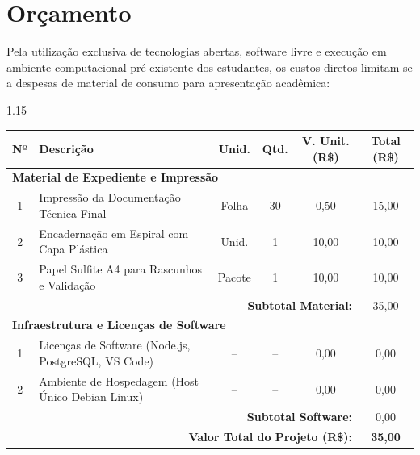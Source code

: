 \documentclass[12pt,a4paper]{article}
\begin{document}
\newpage


\section{Orçamento}

Pela utilização exclusiva de tecnologias abertas, software livre e execução em ambiente computacional pré-existente dos estudantes, os custos diretos limitam-se a despesas de material de consumo para apresentação acadêmica:

\begin{table}[h!]

\centering

\begin{spacing}{1.15}

\begin{tabular}{|c|p{7.5cm}|c|c|c|c|}

\hline

\textbf{Nº} & \textbf{Descrição} & \textbf{Unid.} & \textbf{Qtd.} & \textbf{V. Unit. (R\$)} & \textbf{Total (R\$)} \\ \hline

\multicolumn{6}{|l|}{\textbf{Material de Expediente e Impressão}} \\ \hline

1 & Impressão da Documentação Técnica Final & Folha & 30 & 0,50 & 15,00 \\ \hline

2 & Encadernação em Espiral com Capa Plástica & Unid. & 1 & 10,00 & 10,00 \\ \hline

3 & Papel Sulfite A4 para Rascunhos e Validação & Pacote & 1 & 10,00 & 10,00 \\ \hline

\multicolumn{5}{|r|}{\textbf{Subtotal Material:}} & 35,00 \\ \hline

\multicolumn{6}{|l|}{\textbf{Infraestrutura e Licenças de Software}} \\ \hline

1 & Licenças de Software (Node.js, PostgreSQL, VS Code) & -- & -- & 0,00 & 0,00 \\ \hline

2 & Ambiente de Hospedagem (Host Único Debian Linux) & -- & -- & 0,00 & 0,00 \\ \hline

\multicolumn{5}{|r|}{\textbf{Subtotal Software:}} & 0,00 \\ \hline

\multicolumn{5}{|r|}{\textbf{Valor Total do Projeto (R\$):}} & \textbf{35,00} \\ \hline

\end{tabular}

\end{spacing}

\end{table}
\end{document}
